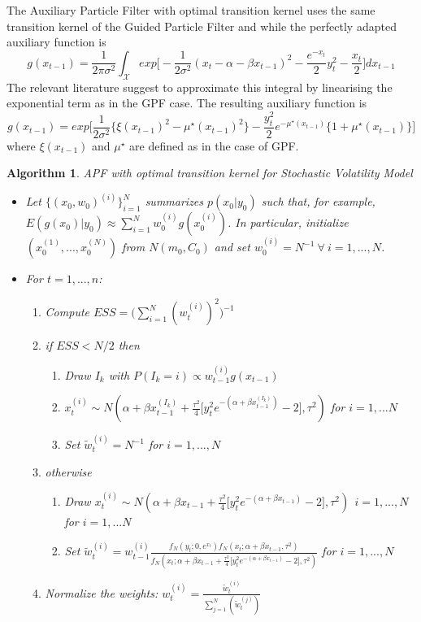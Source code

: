 \documentclass[
]{book}
\theoremstyle{break}
\theoremstyle{nonumberplain}
\newtheorem{algorithm}{Algorithm}[section]
\begin{document}
The Auxiliary Particle Filter with optimal transition kernel uses the
same transition kernel of the Guided Particle Filter and while the
perfectly adapted auxiliary function is
\[g(x_{t-1})=\frac{1}{2\pi\sigma^{2}}\int_{\mathcal{X}}exp\bigg[-\frac{1}{2\sigma^{2}}(x_{t}-\alpha-\beta x_{t-1})^{2}-\frac{e^{-x_{t}}}{2}y_{t}^{2}-\frac{x_{t}}{2}\bigg] dx_{t-1}\]
The relevant literature suggest to approximate this integral by
linearising the exponential term as in the GPF case. The resulting
auxiliary function is
\[ g(x_{t-1})=exp \bigg[ \frac{1}{2\sigma^{2}} \big\{\xi(x_{t-1})^{2}-\mu^{\star}(x_{t-1})^{2} \big\} - \frac{y_{t}^{2}}{2}e^{-\mu^{\star}(x_{t-1})} \big\{ 1+\mu^{\star}(x_{t-1}) \big\}  \bigg]\]
where \(\xi(x_{t-1})\) and \(\mu^{\star}\) are defined as in the case of
GPF.

\begin{algorithm}APF with optimal transition kernel for Stochastic Volatility Model
\begin{itemize}
\item Let $\{(x_{0},w_{0})^{(i)}\}_{i=1}^{N}$ summarizes $p(x_{0}|y_{0})$ such that, for example, $E(g(x_{0})|y_{0}) \approx \sum_{i=1}^{N}w_{0}^{(i)}g(x_{0}^{(i)})$. In particular, initialize $(x_{0}^{(1)},...,x_{0}^{(N)})$ from $N(m_{0},C_{0})$ and set $w_{0}^{(i)}=N^{-1} \ \forall \ i=1,...,N$.
\item For $t=1,...,n$:
\begin{enumerate}
\item Compute $ESS=\Bigg(\sum_{i=1}^{N}(w_{t}^{(i)})^{2}\Bigg)^{-1}$
\item if $ESS<N/2$ then
\begin{enumerate}
\item Draw $I_{k}$ with $P(I_{k}=i) \propto w_{t-1}^{(i)}g(x_{t-1}) $
\item $x_{t}^{(i)} \sim N(\alpha+\beta x_{t-1}^{(I_{k})}+\frac{\tau^2}{4}\big[y_{t}^2e^{-(\alpha+\beta x_{t-1}^{(I_{k})})}-2\big],\tau^{2})$ for $i=1,...N$
\item Set  $\tilde{w}^{(i)}_{t} = N^{-1}$ for $i=1,...,N$
\end{enumerate}
\item otherwise
\begin{enumerate}
\item Draw $x_{t}^{(i)} \sim N(\alpha+\beta x_{t-1}+\frac{\tau^2}{4}\big[y_{t}^2e^{-(\alpha+\beta x_{t-1})}-2\big],\tau^{2}) \ \ i=1,...,N$ for $i=1,...N$
\item Set $\tilde{w}_{t}^{(i)} = w_{t-1}^{(i)}\frac{f_{N}(y_{t};0,e^{x_{t}})f_{N}(x_{t};\alpha+\beta x_{t-1},\tau^{2})}{f_{N}(x_{t};\alpha+\beta x_{t-1}+\frac{\tau^2}{4}\big[y_{t}^2e^{-(\alpha+\beta x_{t-1})}-2\big],\tau^{2})}$ for $i=1,...,N$
\end{enumerate}
\item Normalize the weights: $w_{t}^{(i)}=\frac{\tilde{w}_{t}^{(i)}}{\sum_{j=1}^{N}(\tilde{w}_{t}^{(j)})}$
\end{enumerate}
\end{itemize}
\end{algorithm}
\end{document}
